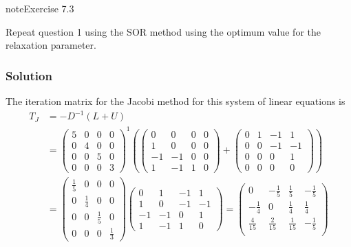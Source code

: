 \documentclass[letterpaper,10pt,english]{jupyterBook}
\begin{document}
\begin{sphinxadmonition}{note}{Exercise 7.3}

\sphinxAtStartPar
Repeat question 1 using the SOR method using the optimum value for the relaxation parameter.
\subsubsection*{Solution}

\sphinxAtStartPar
The iteration matrix for the Jacobi method for this system of linear equations is
\begin{align*}
    T_J &= -D^{-1} (L + U) \\
    &= 
    \begin{pmatrix} 5 & 0 & 0 & 0 \\ 0 & 4 & 0 & 0 \\ 0 & 0 & 5 & 0 \\ 0 & 0 & 0 & 3 \end{pmatrix}^1
    \left(
    \begin{pmatrix} 0 & 0 & 0 & 0 \\ 1 & 0 & 0 & 0 \\ -1 & -1 & 0 & 0 \\ 1 & -1 & 1 & 0 \end{pmatrix} +
    \begin{pmatrix} 0 & 1 & -1 & 1 \\ 0 & 0 & -1 & -1 \\ 0 & 0 & 0 & 1 \\ 0 & 0 & 0 & 0 \end{pmatrix}
    \right) \\
    &= 
    \begin{pmatrix} \frac{1}{5} & 0 & 0 & 0 \\ 0 & \frac{1}{4} & 0 & 0 \\ 0 & 0 & \frac{1}{5} & 0 \\ 0 & 0 & 0 & \frac{1}{3} \end{pmatrix}
    \begin{pmatrix} 0 & 1 & -1 & 1 \\ 1 & 0 & -1 & -1 \\ -1 & -1 & 0 & 1 \\ 1 & -1 & 1 & 0 \end{pmatrix} 
    = 
    \begin{pmatrix}
        0 & - \frac{1}{5} & \frac{1}{5} & - \frac{1}{5} \\
        - \frac{1}{4} & 0 & \frac{1}{4} & \frac{1}{4} \\
        \frac{4}{15} & \frac{2}{15} & \frac{1}{15} & - \frac{1}{5} \\

\end{pmatrix}
\end{align*}
\end{sphinxadmonition}
\end{document}

